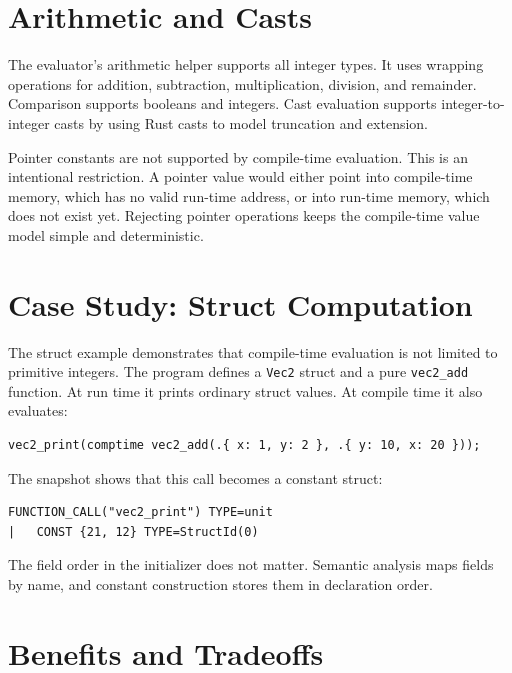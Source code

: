 \section{Arithmetic and Casts}

The evaluator's arithmetic helper supports all integer types. It uses wrapping
operations for addition, subtraction, multiplication, division, and remainder.
Comparison supports booleans and integers. Cast evaluation supports
integer-to-integer casts by using Rust casts to model truncation and extension.

Pointer constants are not supported by compile-time evaluation. This is an
intentional restriction. A pointer value would either point into compile-time
memory, which has no valid run-time address, or into run-time memory, which does
not exist yet. Rejecting pointer operations keeps the compile-time value model
simple and deterministic.

\section{Case Study: Struct Computation}

The struct example demonstrates that compile-time evaluation is not limited to
primitive integers. The program defines a \texttt{Vec2} struct and a pure
\texttt{vec2\_add} function. At run time it prints ordinary struct values. At
compile time it also evaluates:

\begin{lstlisting}[language=EPL,caption={Compile-time struct expression}]
vec2_print(comptime vec2_add(.{ x: 1, y: 2 }, .{ y: 10, x: 20 }));
\end{lstlisting}

The \irtree{} snapshot shows that this call becomes a constant struct:

\begin{lstlisting}[caption={Struct constant after compile-time evaluation}]
FUNCTION_CALL("vec2_print") TYPE=unit
|   CONST {21, 12} TYPE=StructId(0)
\end{lstlisting}

The field order in the initializer does not matter. Semantic analysis maps
fields by name, and constant construction stores them in declaration order.

\section{Benefits and Tradeoffs}

